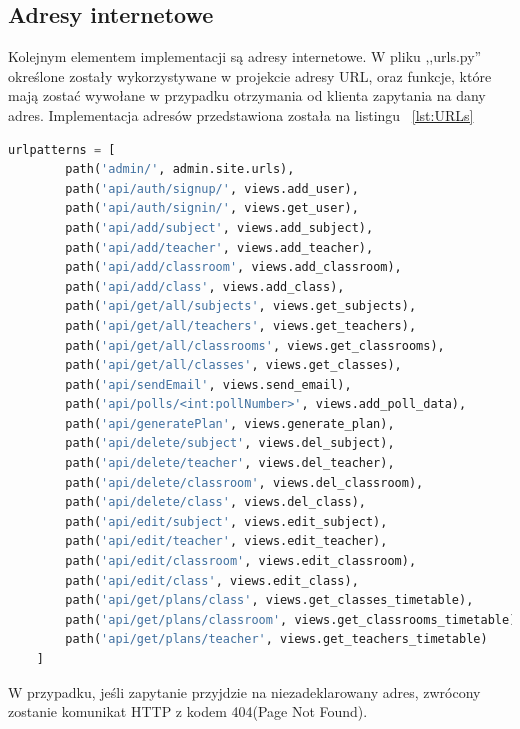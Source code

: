 \subsection{Adresy internetowe}
Kolejnym elementem implementacji są adresy internetowe. W pliku ,,urls.py'' określone zostały wykorzystywane w projekcie adresy URL, oraz funkcje, które mają zostać wywołane w przypadku otrzymania od klienta zapytania na dany adres. Implementacja adresów przedstawiona została na listingu ~\ref{lst:URLs}
\begin{lstlisting}[language=Python, caption=Implementacja adresów URL, label={lst:URLs}]
	urlpatterns = [
		path('admin/', admin.site.urls),
		path('api/auth/signup/', views.add_user),
		path('api/auth/signin/', views.get_user),
		path('api/add/subject', views.add_subject),
		path('api/add/teacher', views.add_teacher),
		path('api/add/classroom', views.add_classroom),
		path('api/add/class', views.add_class),
		path('api/get/all/subjects', views.get_subjects),
		path('api/get/all/teachers', views.get_teachers),
		path('api/get/all/classrooms', views.get_classrooms),
		path('api/get/all/classes', views.get_classes),
		path('api/sendEmail', views.send_email),
		path('api/polls/<int:pollNumber>', views.add_poll_data),
		path('api/generatePlan', views.generate_plan),
		path('api/delete/subject', views.del_subject),
		path('api/delete/teacher', views.del_teacher),
		path('api/delete/classroom', views.del_classroom),
		path('api/delete/class', views.del_class),
		path('api/edit/subject', views.edit_subject),
		path('api/edit/teacher', views.edit_teacher),
		path('api/edit/classroom', views.edit_classroom),
		path('api/edit/class', views.edit_class),
		path('api/get/plans/class', views.get_classes_timetable),
		path('api/get/plans/classroom', views.get_classrooms_timetable),
		path('api/get/plans/teacher', views.get_teachers_timetable)
	]
\end{lstlisting}
W przypadku, jeśli zapytanie przyjdzie na niezadeklarowany adres, zwrócony zostanie komunikat HTTP z kodem 404(Page Not Found).

